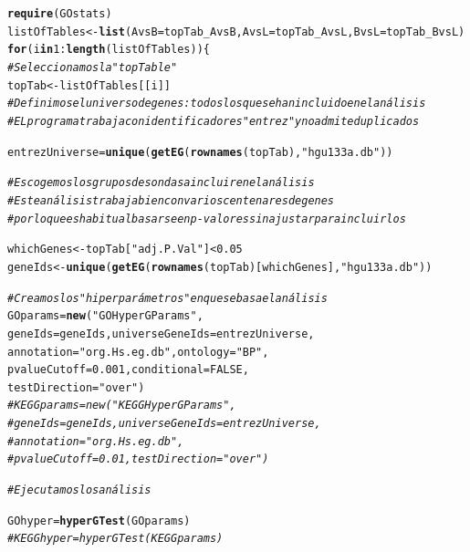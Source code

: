 \documentclass[a4paper]{article}\usepackage[]{graphicx}\usepackage[]{color}
\makeatletter
\newcommand{\hlnum}[1]{\textcolor[rgb]{0.686,0.059,0.569}{#1}}%
\newcommand{\hlstr}[1]{\textcolor[rgb]{0.192,0.494,0.8}{#1}}%
\newcommand{\hlcom}[1]{\textcolor[rgb]{0.678,0.584,0.686}{\textit{#1}}}%
\newcommand{\hlopt}[1]{\textcolor[rgb]{0,0,0}{#1}}%
\newcommand{\hlstd}[1]{\textcolor[rgb]{0.345,0.345,0.345}{#1}}%
\newcommand{\hlkwa}[1]{\textcolor[rgb]{0.161,0.373,0.58}{\textbf{#1}}}%
\newcommand{\hlkwb}[1]{\textcolor[rgb]{0.69,0.353,0.396}{#1}}%
\newcommand{\hlkwc}[1]{\textcolor[rgb]{0.333,0.667,0.333}{#1}}%
\newcommand{\hlkwd}[1]{\textcolor[rgb]{0.737,0.353,0.396}{\textbf{#1}}}%
\newenvironment{kframe}{%
 \def\at@end@of@kframe{}%
 \ifinner\ifhmode%
  \def\at@end@of@kframe{\end{minipage}}%
  \begin{minipage}{\columnwidth}%
 \fi\fi%
 \def\FrameCommand##1{\hskip\@totalleftmargin \hskip-\fboxsep
 \colorbox{shadecolor}{##1}\hskip-\fboxsep
     \hskip-\linewidth \hskip-\@totalleftmargin \hskip\columnwidth}%
 \MakeFramed {\advance\hsize-\width
   \@totalleftmargin\z@ \linewidth\hsize
   \@setminipage}}%
 {\par\unskip\endMakeFramed%
 \at@end@of@kframe}
\newenvironment{knitrout}{}{} %
\makeatother
\begin{document}
\begin{knitrout}
\color{fgcolor}\begin{kframe}
\begin{alltt}
\hlkwd{require}\hlstd{(GOstats)}
\hlstd{listOfTables} \hlkwb{<-} \hlkwd{list}\hlstd{(}\hlkwc{AvsB} \hlstd{= topTab_AvsB,} \hlkwc{AvsL} \hlstd{= topTab_AvsL,} \hlkwc{BvsL} \hlstd{= topTab_BvsL)}
\hlkwa{for} \hlstd{(i} \hlkwa{in} \hlnum{1}\hlopt{:}\hlkwd{length}\hlstd{(listOfTables))\{}
  \hlcom{# Seleccionamos la "topTable"}
  \hlstd{topTab} \hlkwb{<-} \hlstd{listOfTables[[i]]}
  \hlcom{# Definimos el universo de genes: todos los que se han incluido en el análisis}
  \hlcom{# EL programa trabaja con identificadores "entrez" y no admite duplicados}

  \hlstd{entrezUniverse} \hlkwb{=} \hlkwd{unique}\hlstd{(}\hlkwd{getEG}\hlstd{(}\hlkwd{rownames}\hlstd{(topTab),} \hlstr{"hgu133a.db"}\hlstd{))}

  \hlcom{# Escogemos los grupos de sondas a incluir en el análisis}
  \hlcom{# Este análisis trabaja bien con varios centenares de genes }
  \hlcom{# por lo que es habitual basarse en p-valores sin ajustar para incluirlos}

  \hlstd{whichGenes}\hlkwb{<-}\hlstd{topTab[}\hlstr{"adj.P.Val"}\hlstd{]}\hlopt{<}\hlnum{0.05}
  \hlstd{geneIds} \hlkwb{<-}   \hlkwd{unique}\hlstd{(}\hlkwd{getEG}\hlstd{(}\hlkwd{rownames}\hlstd{(topTab)[whichGenes],}\hlstr{"hgu133a.db"}\hlstd{))}

  \hlcom{# Creamos los "hiperparámetros" en que se basa el análisis}
  \hlstd{GOparams} \hlkwb{=} \hlkwd{new}\hlstd{(}\hlstr{"GOHyperGParams"}\hlstd{,}
    \hlkwc{geneIds}\hlstd{=geneIds,} \hlkwc{universeGeneIds}\hlstd{=entrezUniverse,}
    \hlkwc{annotation}\hlstd{=}\hlstr{"org.Hs.eg.db"}\hlstd{,} \hlkwc{ontology}\hlstd{=}\hlstr{"BP"}\hlstd{,}
    \hlkwc{pvalueCutoff}\hlstd{=}\hlnum{0.001}\hlstd{,} \hlkwc{conditional}\hlstd{=}\hlnum{FALSE}\hlstd{,}
    \hlkwc{testDirection}\hlstd{=}\hlstr{"over"}\hlstd{)}
  \hlcom{# KEGGparams = new("KEGGHyperGParams",}
  \hlcom{#   geneIds=geneIds, universeGeneIds=entrezUniverse,}
  \hlcom{#   annotation="org.Hs.eg.db",  }
  \hlcom{#   pvalueCutoff=0.01, testDirection="over")}

  \hlcom{# Ejecutamos los análisis}

  \hlstd{GOhyper} \hlkwb{=} \hlkwd{hyperGTest}\hlstd{(GOparams)}
  \hlcom{# KEGGhyper = hyperGTest(KEGGparams)}


\end{alltt}
\end{kframe}
\end{knitrout}
\end{document}

